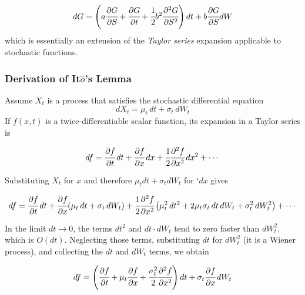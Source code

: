 \begin{equation}
dG = \left(a\cfrac{\partial G}{\partial S} + \cfrac{\partial G}{\partial t} + \cfrac{1}{2}b^2\cfrac{\partial^2 G}{\partial S^2} \right)dt + b \cfrac{\partial G}{\partial S}dW
\label{eq:itos_lemma}
\end{equation}
which is essentially an extension of the \emph{Taylor series} expansion applicable to stochastic functions.

\begin{attention}
\subsubsection{Derivation of It$\hat{o}$'s Lemma}
Assume $X_t$ is a process that satisfies the stochastic differential equation
\begin{equation*}	
dX_{t}=\mu_{t}\,dt+\sigma_{t}\,dW_{t}
\end{equation*}
If $f(x, t)$ is a twice-differentiable scalar function, its expansion in a Taylor series is
	
\begin{equation*}
df={\cfrac {\partial f}{\partial t}}\,dt+{\cfrac {\partial f}{\partial x}}\,dx+{\cfrac {1}{2}}{\cfrac {\partial ^{2}f}{\partial x^{2}}}\,dx^{2}+\cdots 
\end{equation*}

Substituting $X_t$ for $x$ and therefore $\mu_t dt + \sigma_t dW_t$ for `$dx$ gives
	
\begin{equation*}
df={\cfrac {\partial f}{\partial t}}\,dt+{\cfrac {\partial f}{\partial x}}(\mu _{t}\,dt+\sigma _{t}\,dW_{t})+{\cfrac {1}{2}}{\cfrac {\partial ^{2}f}{\partial x^{2}}}\left(\mu _{t}^{2}\,dt^{2}+2\mu _{t}\sigma _{t}\,dt\,dW_{t}+\sigma _{t}^{2}\,dW_{t}^{2}\right)+\cdots 
\end{equation*}

In the limit $dt\rightarrow 0$, the terms $dt^2$ and $dt\cdot dW_t$ tend to zero faster than $dW_t^2$, which is $O(dt)$. Neglecting those terms, substituting $dt$ for $dW_t^2$ (it is a Wiener process), and collecting the $dt$ and $dW_t$ terms, we obtain
	
\begin{equation*}
df=\left({\cfrac {\partial f}{\partial t}}+\mu _{t}{\cfrac {\partial f}{\partial x}}+{\cfrac {\sigma _{t}^{2}}{2}}{\cfrac {\partial ^{2}f}{\partial x^{2}}}\right)dt+\sigma _{t}{\cfrac {\partial f}{\partial x}}\,dW_{t}
\end{equation*}
\end{attention}

